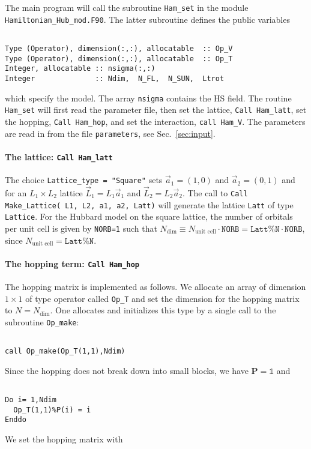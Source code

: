 The main program will call the subroutine   \texttt{Ham\_set} in the module \texttt{Hamiltonian\_Hub\_mod.F90}.
The latter  subroutine  defines the  public variables
\lstset{style=fortran}
\begin{lstlisting}

Type (Operator), dimension(:,:), allocatable  :: Op_V 
Type (Operator), dimension(:,:), allocatable  :: Op_T
Integer, allocatable :: nsigma(:,:)
Integer              :: Ndim,  N_FL,  N_SUN,  Ltrot

\end{lstlisting}
which specify the model. The array \texttt{nsigma} contains the HS field. The  routine \texttt{Ham\_set}  will first  read the parameter file,  then set the lattice, \texttt{Call Ham\_latt},  set the hopping, \texttt{Call Ham\_hop},  and set the interaction, 
\texttt{call Ham\_V}.  
The parameters are read in from the file \texttt{parameters}, see Sec.~\ref{sec:input}.

\paragraph{The lattice:   \texttt{Call Ham\_latt} }

The choice \texttt{Lattice\_type = "Square"} sets $\vec{a}_1 =  (1,0) $ and $\vec{a}_2 =  (0,1) $  and for an $L_1 \times L_2$  lattice  $\vec{L}_1 = L_1 \vec{a}_1$ and  $\vec{L}_2 = L_2 \vec{a}_2$.     The call to  \texttt{Call Make\_Lattice( L1, L2, a1,  a2, Latt)} will generate the lattice   \texttt{Latt} of type \texttt{Lattice}. 
For the Hubbard model on the square lattice, the number of orbitals per unit cell is given by \texttt{NORB=1} such that   $N_{\mathrm{dim}}   \equiv N_{\text{unit cell}}   \cdot \texttt{NORB}  = \texttt{Latt\%N} \cdot \texttt{NORB}$, since $N_{\text{unit cell}} = \texttt{Latt\%N}$.

\paragraph{The hopping term: \texttt{Call Ham\_hop}}

The hopping matrix is implemented as follows. 
We allocate an array of dimension $1\times 1$ of type operator  called \texttt{Op\_T} and set the  dimension for the hopping  matrix to $N=N_{\mathrm{dim}}$. One  allocates and initializes this type by a single call to the subroutine \texttt{Op\_make}: 
\begin{lstlisting}

call Op_make(Op_T(1,1),Ndim)

\end{lstlisting}
Since the hopping  does not  break down into small blocks, we have ${\bm P}=\mathds{1}$   and  
\begin{lstlisting}

Do i= 1,Ndim
  Op_T(1,1)%P(i) = i
Enddo

\end{lstlisting}
We set the hopping matrix  with 

